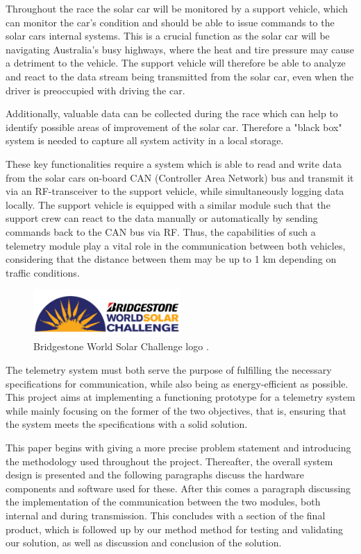 \documentclass[conference]{IEEEtran}
\begin{document}
Throughout the race the solar car will be monitored by a support vehicle, which can monitor the car's condition and should be able to issue commands to the solar cars internal systems. This is a crucial function as the solar car will be navigating Australia's busy highways, where the heat and tire pressure may cause a detriment to the vehicle. The support vehicle will therefore be able to analyze and react to the data stream being transmitted from the solar car, even when the driver is preoccupied with driving the car. 

Additionally, valuable data can be collected during the race which can help to identify possible areas of improvement of the solar car. Therefore a "black box" system is needed to capture all system activity in a local storage.

These key functionalities require a system which is able to read and write data from the solar cars on-board CAN (Controller Area Network) bus and transmit it via an RF-transceiver to the support vehicle, while simultaneously logging data locally. The support vehicle is equipped with a similar module such that the support crew can react to the data manually or automatically by sending commands back to the CAN bus via RF. Thus, the capabilities of such a telemetry module play a vital role in the communication between both vehicles, considering that the distance between them may be up to 1 km depending on traffic conditions.

\begin{figure}[b]
    \centering
    \includegraphics[width=0.5\textwidth]{documentation/images/SolarChallengeLogo.pdf}
    \caption{Bridgestone World Solar Challenge logo \cite{wsc}.}
    \label{fig:solar}
\end{figure}

The telemetry system must both serve the purpose of fulfilling the necessary specifications for communication, while also being as energy-efficient as possible. This project aims at implementing a functioning prototype for a telemetry system while mainly focusing on the former of the two objectives, that is, ensuring that the system meets the specifications with a solid solution.

This paper begins with giving a more precise problem statement and introducing the methodology used throughout the project. Thereafter, the overall system design is presented and the following paragraphs discuss the hardware components and software used for these. After this comes a paragraph discussing the implementation of the communication between the two modules, both internal and during transmission. This concludes with a section of the final product, which is followed up by our method method for testing and validating our solution, as well as discussion and conclusion of the solution.
\end{document}
